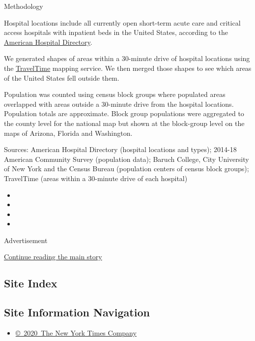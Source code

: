 Methodology

Hospital locations include all currently open short-term acute care and
critical access hospitals with inpatient beds in the United States,
according to the \href{https://www.ahd.com/}{American Hospital
Directory}.

We generated shapes of areas within a 30-minute drive of hospital
locations using the \href{https://traveltime.com/}{TravelTime} mapping
service. We then merged those shapes to see which areas of the United
States fell outside them.

Population was counted using census block groups where populated areas
overlapped with areas outside a 30-minute drive from the hospital
locations. Population totals are approximate. Block group populations
were aggregated to the county level for the national map but shown at
the block-group level on the maps of Arizona, Florida and Washington.

Sources: American Hospital Directory (hospital locations and types);
2014-18 American Community Survey (population data); Baruch College,
City University of New York and the Census Bureau (population centers of
census block groups); TravelTime (areas within a 30-minute drive of each
hospital)

\begin{itemize}
\item
\item
\item
\item
\end{itemize}

Advertisement

\protect\hyperlink{after-bottom}{Continue reading the main story}

\hypertarget{site-index}{%
\subsection{Site Index}\label{site-index}}

\hypertarget{site-information-navigation}{%
\subsection{Site Information
Navigation}\label{site-information-navigation}}

\begin{itemize}
\tightlist
\item
  \href{https://help.nytimes3xbfgragh.onion/hc/en-us/articles/115014792127-Copyright-notice}{©~2020~The
  New York Times Company}
\end{itemize}

